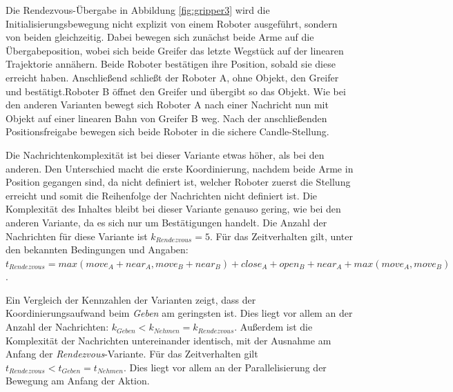 Die Rendezvous-Übergabe in Abbildung \ref{fig:gripper3} wird die Initialisierungsbewegung nicht explizit von einem Roboter ausgeführt, sondern von beiden gleichzeitig. Dabei bewegen sich zunächst beide Arme auf die Übergabeposition, wobei sich beide Greifer das letzte Wegstück auf der linearen Trajektorie annähern. Beide Roboter bestätigen ihre Position, sobald sie diese erreicht haben. Anschließend schließt der Roboter A, ohne Objekt, den Greifer und bestätigt.Roboter B öffnet den Greifer und übergibt so das Objekt. Wie bei den anderen Varianten bewegt sich Roboter A nach einer Nachricht nun mit Objekt auf einer linearen Bahn von Greifer B weg. Nach der anschließenden Positionsfreigabe bewegen sich beide Roboter in die sichere Candle-Stellung.

Die Nachrichtenkomplexität ist bei dieser Variante etwas höher, als bei den anderen. Den Unterschied macht die erste Koordinierung, nachdem beide Arme in Position gegangen sind, da nicht definiert ist, welcher Roboter zuerst die Stellung erreicht und somit die Reihenfolge der Nachrichten nicht definiert ist. Die Komplexität des Inhaltes bleibt bei dieser Variante genauso gering, wie bei den anderen Variante, da es sich nur um Bestätigungen handelt. Die Anzahl der Nachrichten für diese Variante ist $k_{Rendezvous} = 5$. Für das Zeitverhalten gilt, unter den bekannten Bedingungen und Angaben:  $t_{Rendezvous} = max(move_A + near_A, move_B + near_B) + close_A + open_B + near_A + max(move_A, move_B)$.

Ein Vergleich der Kennzahlen der Varianten zeigt, dass der Koordinierungsaufwand beim \textit{Geben} am geringsten ist. Dies liegt vor allem an der Anzahl der Nachrichten: $k_{Geben} < k_{Nehmen} = k_{Rendezvous}$. Außerdem ist die Komplexität der Nachrichten untereinander identisch, mit der Ausnahme am Anfang der \textit{Rendezvous}-Variante. Für das Zeitverhalten gilt $t_{Rendezvous} < t_{Geben} = t_{Nehmen}$. Dies liegt vor allem an der Parallelisierung der Bewegung am Anfang der Aktion.



